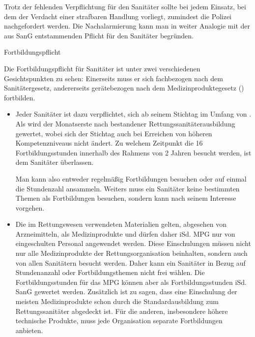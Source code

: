 {\begin{itemize}
\begin{itemize}
  Trotz der fehlenden Verpflichtung für den Sanitäter sollte
  bei jedem Einsatz, bei dem der Verdacht einer strafbaren
  Handlung vorliegt, zumindest die Polizei nachgefordert
  werden. Die Nachalarmierung kann man in weiter Analogie
  mit der aus  SanG entstammenden Pflicht für den
  Sanitäter
   begründen.
  \end{itemize}
\end{itemize}





}
{}
{}
{}
{}

\TextSlide
{Fortbildungspflicht}
{\label{topic:fortbildungspflicht}
Die Fortbildungspflicht für Sanitäter ist unter zwei
verschiedenen Gesichtspunkten zu sehen: Einerseits muss er
sich fachbezogen nach dem Sanitätergesetz, andererseits
gerätebezogen nach dem Medizinproduktegesetz ()
fortbilden.

\begin{itemize}
  \item {}
  Jeder Sanitäter ist dazu verpflichtet, sich  ab seinem Stichtag im Umfang von . Als  wird der
  Monatserste nach bestandener Rettungssanitäterausbildung
  gewertet, wobei sich der Stichtag auch bei Erreichen von
  höheren Kompetenzniveaus nicht ändert. Zu welchem Zeitpunkt
  die 16 Fortbildungsstunden innerhalb des Rahmens von 2
  Jahren besucht werden, ist dem Sanitäter überlassen.
  
  Man kann also entweder regelmäßig Fortbildungen besuchen
  oder auf einmal die Stundenzahl ansammeln. Weiters muss ein
  Sanitäter keine bestimmten Themen als Fortbildungen
  besuchen, sondern kann nach seinem Interesse vorgehen.
  
  \item {}
  Die im Rettungswesen verwendeten Materialien gelten,
  abgesehen von Arzneimitteln, als Medizinprodukte und dürfen
  daher iSd. MPG nur von eingeschulten Personal angewendet
  werden. Diese Einschulungen müssen nicht nur alle
  Medizinprodukte der Rettungsorganisation beinhalten, sondern
  auch von allen Sanitätern besucht werden. Daher kann ein
  Sanitäter in Bezug auf Stundenanzahl oder Fortbildungsthemen
  nicht frei wählen. Die Fortbildungsstunden für das MPG
  können aber als Fortbildungsstunden iSd. SanG gewertet
  werden. Zusätzlich ist zu sagen, dass eine Einschulung der
  meisten Medizinprodukte schon durch die Standardausbildung
  zum Rettungssanitäter abgedeckt ist. Für die anderen,
  insbesondere höhere technische Produkte, muss jede
  Organisation separate Fortbildungen anbieten.
\end{itemize}



}
